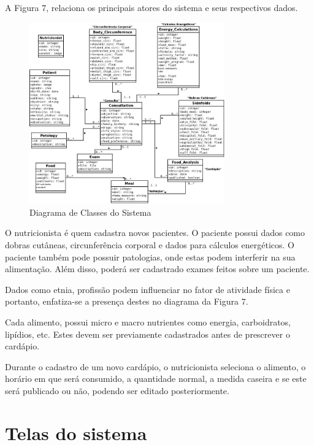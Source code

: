 \documentclass[
	12pt,				%
    oneside,			%
	a4paper,			%
	english,			%
	french,				%
	spanish,			%
	brazil,				%
	]{abntex2}
\begin{document}
A Figura 7, relaciona os principais atores do sistema e seus respectivos dados.

\begin{figure} [hbt] 
\label{diagClass1} 
\caption{Diagrama de Classes do Sistema}
\begin{center}
\includegraphics[width=0.75\textwidth]{bd-sistema.jpeg}
\end{center}
\end{figure}

O nutricionista é quem cadastra novos pacientes. O paciente possui dados como
dobras cutâneas, circunferência corporal e dados para cálculos energéticos. O
paciente também pode possuir patologias, onde estas podem interferir na sua
alimentação. Além disso, poderá ser cadastrado exames feitos sobre um paciente. 

Dados como etnia, profissão podem influenciar no fator de atividade física e portanto,
enfatiza-se a presença destes no diagrama da Figura 7.

Cada alimento, possui micro e macro nutrientes como energia, carboidratos,
lipídios, etc. Estes devem ser previamente cadastrados antes de prescrever o
cardápio.

Durante o cadastro de um novo cardápio, o nutricionista seleciona o alimento,
o horário em que será consumido, a quantidade normal, a medida caseira e se este
será publicado ou não, podendo ser editado posteriormente.

\section{Telas do sistema}
\end{document}
